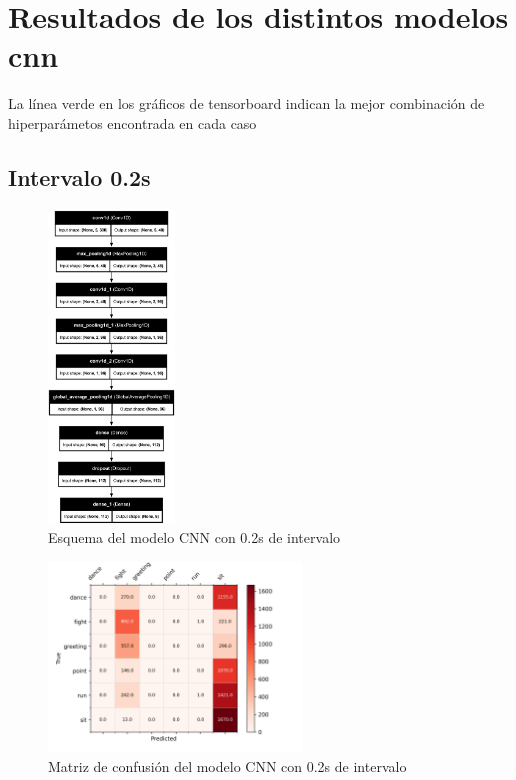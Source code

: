 \chapter{Resultados de los distintos modelos \gls{cnn}}
\label{appendix:resultadosCNN}

La línea verde en los gráficos de tensorboard indican la mejor combinación de hiperparámetos encontrada en cada caso

\section{Intervalo 0.2s}

\begin{figure}[H]
    \centering
    \includegraphics[width=0.3\textwidth]{Imagenes/Bitmap/best-cnn0.2.png}
    \caption{Esquema del modelo CNN con 0.2s de intervalo}
    \label{fig:cnn-0.2-final}
\end{figure}
\begin{figure}[H]
    \centering
    \includegraphics[width=0.6\textwidth]{Imagenes/Bitmap/CM_best-cnn0.2.png}
    \caption{Matriz de confusión del modelo CNN con 0.2s de intervalo}
    \label{fig:cnn-0.2-matriz}
\end{figure}
